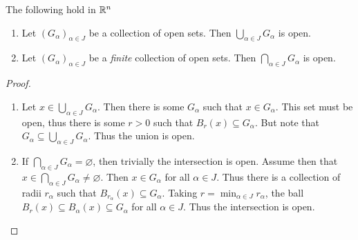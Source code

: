 \documentclass{subfile}
\begin{document}
\begin{theorem}[$\R^n$ is a topology]
    The following hold in $\R^n$
    \begin{enumerate}[label=\roman*)]
        \item Let $(G_{\alpha})_{\alpha \in J}$ be a collection of open sets. Then $\bigcup_{\alpha \in J} G_{\alpha}$ is open.
        \item Let $(G_{\alpha})_{\alpha \in J}$ be a \emph{finite} collection of open sets. Then $\bigcap_{\alpha \in J} G_{\alpha}$ is open.
    \end{enumerate}
\end{theorem}

\begin{proof}
    \begin{enumerate}[label=\roman*)]
        \item
            Let $x \in \bigcup_{\alpha \in J} G_{\alpha}$. Then there is some $G_{\alpha}$ such that $x \in G_{\alpha}$. This set must be open, thus there is some $r > 0$ such that $B_{r}(x) \subseteq G_{\alpha}$. But note that $G_{\alpha} \subseteq \bigcup_{\alpha \in J} G_{\alpha}$. Thus the union is open.
        \item
            If $\bigcap_{\alpha \in J} G_{\alpha} = \varnothing$, then trivially the intersection is open. Assume then that $x \in \bigcap_{\alpha \in J} G_{\alpha} \neq \varnothing$. Then $x \in G_{\alpha}$ for all $\alpha \in J$. Thus there is a collection of radii $r_{\alpha}$ such that $B_{r_{\alpha}}(x) \subseteq G_{\alpha}$. Taking $r = \min_{\alpha \in J} r_{\alpha}$, the ball $B_{r}(x) \subseteq B_{\alpha}(x) \subseteq G_{\alpha}$ for all $\alpha \in J$. Thus the intersection is open.
    \end{enumerate}
\end{proof}
\end{document}

